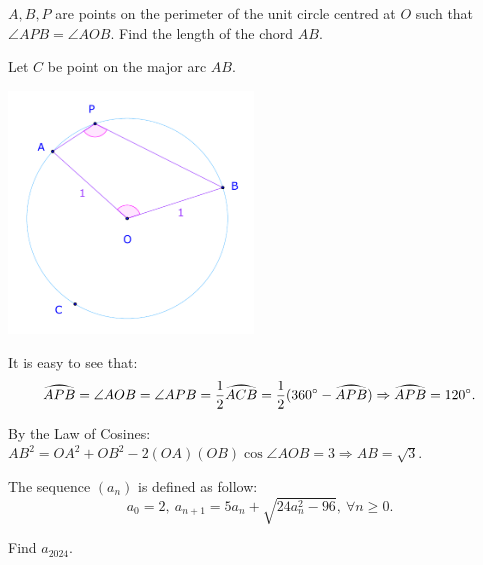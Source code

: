 \documentclass{article}
\begin{document}
\newpage

\begin{problem}
    $A, B, P$ are points on the perimeter of the unit circle centred at $O$ such that $\angle APB = \angle AOB.$
    Find the length of the chord $AB.$
\end{problem}

\begin{soln}
    Let $C$ be point on the major arc $AB.$ 
    \begin{center}
        \includegraphics[width=6.5cm]{./svg/pdf/23-24-sm2-s4-ct-p3-9-2.pdf}
    \end{center}
    
    It is easy to see that:
    \[
        \arc{APB} = \angle {AOB} = \angle {APB} = \half \arc{ACB} = \half(360\dg - \arc{APB})\Rightarrow \arc{APB} = 120\dg.
    \]

    By the Law of Cosines: $AB^2 = OA^2 + OB^2 - 2(OA)(OB) \cos{\angle AOB} = 3 \Rightarrow AB = \boxed{\sqrt{3}.}$
\end{soln}

\begin{problem}
    The sequence $(a_n)$ is defined as follow:
    \[
        a_0 = 2,\ a_{n+1} = 5a_n + \sqrt{24a_n^2 - 96},\ \forall n \ge 0.
    \]
    
    Find $a_{2024}.$
\end{problem}
\end{document}
